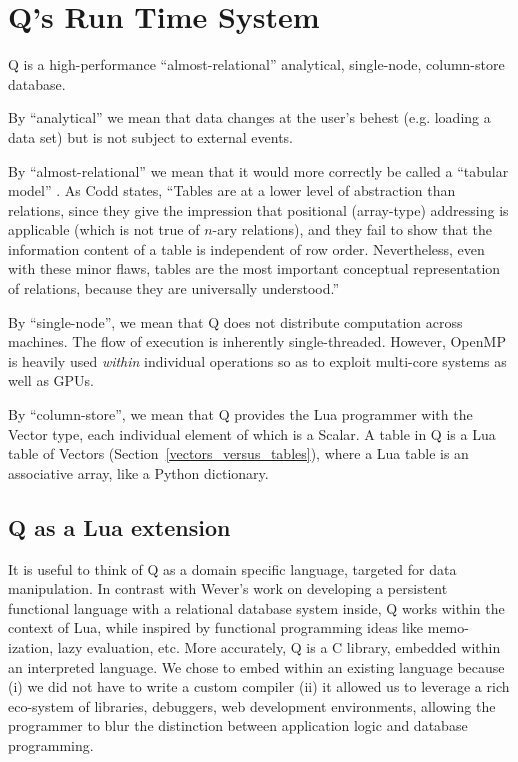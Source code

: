 \section{Q's Run Time System}

Q is a high-performance ``almost-relational'' 
analytical, single-node, column-store database. 
\be
\item 
By ``analytical'' we mean that data changes at the user's behest (e.g.
loading a data set) but is not subject to external events.
\item 
By ``almost-relational'' we mean that it would more correctly
be called a ``tabular model'' \cite{Codd1982}. As Codd states, ``Tables are
at a lower level of abstraction than relations, since they give
the impression that positional (array-type) addressing is applicable
(which is not true of \(n\)-ary relations), and they fail to
show that the information content of a table is independent
of row order. Nevertheless, even with these minor flaws,
tables are the most important conceptual representation of
relations, because they are universally understood.''
\item By ``single-node'', we mean that Q does not distribute computation across
  machines. The flow of execution is inherently single-threaded. However,
  OpenMP is heavily used {\em within} individual operations so as
  to exploit multi-core systems as well as GPUs.
\item By ``column-store'', we mean that 
Q provides the Lua programmer with the Vector type, each
individual element of which is a Scalar. A table in Q is a Lua
table of Vectors (Section~\ref{vectors_versus_tables}), where a Lua table is an
associative array, like a Python dictionary.

\ee

\subsection{Q as a Lua extension}


It is useful to think of Q as a domain specific language, targeted for data
manipulation. In contrast with Wever's work \cite{Wever2014} on
developing a persistent functional language with
a relational database system inside, Q works within the context of Lua, while
inspired by functional programming ideas like memo-ization, lazy evaluation,
etc.
More accurately, Q is a C library, embedded within an interpreted
language.
We chose to embed within an existing language because (i) we did not have to
write a custom compiler (ii) it allowed us to leverage a rich eco-system of
libraries, debuggers, web development environments, allowing the programmer to
blur the distinction between application logic and database programming.

